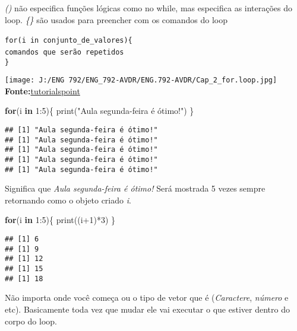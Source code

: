 \documentclass[
]{book}
\newenvironment{Shaded}{\begin{snugshade}}{\end{snugshade}}
\newcommand{\ControlFlowTok}[1]{\textcolor[rgb]{0.13,0.29,0.53}{\textbf{#1}}}
\newcommand{\DecValTok}[1]{\textcolor[rgb]{0.00,0.00,0.81}{#1}}
\newcommand{\FunctionTok}[1]{\textcolor[rgb]{0.00,0.00,0.00}{#1}}
\newcommand{\NormalTok}[1]{#1}
\newcommand{\SpecialCharTok}[1]{\textcolor[rgb]{0.00,0.00,0.00}{#1}}
\newcommand{\StringTok}[1]{\textcolor[rgb]{0.31,0.60,0.02}{#1}}
\begin{document}
\emph{()} não especifica funções lógicas como no while, mas especifica as interações do loop.
\emph{\{\}} são usados para preencher com os comandos do loop

\texttt{for(i\ in\ conjunto\_de\_valores)\{}~\\
\texttt{comandos\ que\ serão\ repetidos}~\\
\texttt{\}}

\texttt{[image: J:/ENG 792/ENG\_792-AVDR/ENG.792-AVDR/Cap\_2\_for.loop.jpg]}\\
\textbf{Fonte:}\href{https://www.tutorialspoint.com/r/r_for_loop.htm}{tutorialspoint}

\begin{Shaded}
\begin{Highlighting}[]
\ControlFlowTok{for}\NormalTok{(i  }\ControlFlowTok{in} \DecValTok{1}\SpecialCharTok{:}\DecValTok{5}\NormalTok{)\{}
  \FunctionTok{print}\NormalTok{(}\StringTok{"Aula segunda{-}feira é ótimo!"}\NormalTok{)}
\NormalTok{\}}
\end{Highlighting}
\end{Shaded}

\begin{verbatim}
## [1] "Aula segunda-feira é ótimo!"
## [1] "Aula segunda-feira é ótimo!"
## [1] "Aula segunda-feira é ótimo!"
## [1] "Aula segunda-feira é ótimo!"
## [1] "Aula segunda-feira é ótimo!"
\end{verbatim}

Significa que \emph{Aula segunda-feira é ótimo!} Será mostrada 5 vezes sempre retornando como o objeto criado \emph{i}.

\begin{Shaded}
\begin{Highlighting}[]
\ControlFlowTok{for}\NormalTok{(i }\ControlFlowTok{in}  \DecValTok{1}\SpecialCharTok{:}\DecValTok{5}\NormalTok{)\{}
  \FunctionTok{print}\NormalTok{((i}\SpecialCharTok{+}\DecValTok{1}\NormalTok{)}\SpecialCharTok{*}\DecValTok{3}\NormalTok{)}
\NormalTok{  \}}
\end{Highlighting}
\end{Shaded}

\begin{verbatim}
## [1] 6
## [1] 9
## [1] 12
## [1] 15
## [1] 18
\end{verbatim}

Não importa onde você começa ou o tipo de vetor que é (\emph{Caractere}, \emph{número} e etc). Basicamente toda vez que mudar ele vai executar o que estiver dentro do corpo do loop.
\end{document}
